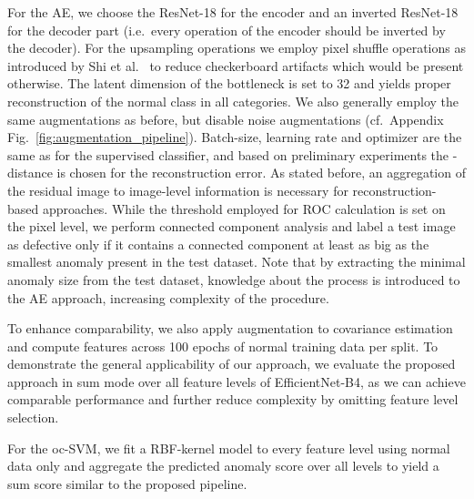\documentclass[conference, a4paper]{./template/IEEEtran}
\begin{document}
For the AE, we choose the ResNet-18 for the encoder and an inverted ResNet-18 for the decoder part (i.e.\ every operation of the encoder should be inverted by the decoder).
For the upsampling operations we employ pixel shuffle operations as introduced by Shi et al.\ \cite{Shi2016a} to reduce checkerboard artifacts which would be present otherwise.
The latent dimension of the bottleneck is set to 32 and yields proper reconstruction of the normal class in all categories.
We also generally employ the same augmentations as before, but disable noise augmentations (cf.\ Appendix Fig.~\ref{fig:augmentation_pipeline}).
Batch-size, learning rate and optimizer are the same as for the supervised classifier, and based on preliminary experiments the -distance is chosen for the reconstruction error.
As stated before, an aggregation of the residual image to image-level information is necessary for reconstruction-based approaches.
While the threshold employed for ROC calculation is set on the pixel level, we perform connected component analysis and label a test image as defective only if it contains a connected component at least as big as the smallest anomaly present in the test dataset.
Note that by extracting the minimal anomaly size from the test dataset, knowledge about the process is introduced to the AE approach, increasing complexity of the procedure.


To enhance comparability, we also apply augmentation to covariance estimation and compute features across 100 epochs of normal training data per split.
To demonstrate the general applicability of our approach, we evaluate the proposed approach in sum mode over all feature levels of EfficientNet-B4, as we can achieve comparable performance and further reduce complexity by omitting feature level selection.

For the oc-SVM, we fit a RBF-kernel model to every feature level using normal data only and aggregate the predicted anomaly score over all levels to yield a sum score similar to the proposed pipeline. 
\end{document}
